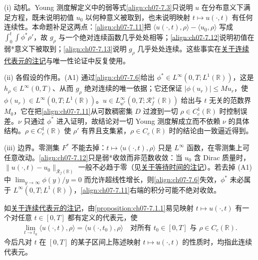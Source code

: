 ﻿\documentclass[../../main.tex]{subfiles}%
\begin{document}
\begin{remark}\label{remark:ch07-7.1.1动机}
(i) 动机。Young 测度解定义中的弱等式\eqref{align:ch07-7.3}只说明 $u$ 在分布意义下满足方程，既未说明初值 $u_0$ 以何种意义被取到，也未说明映射 $t\mapsto u(\cdot,t)$ 有任何连续性。本命题补足这两点：\eqref{align:ch07-7.11}把 $\langle u(\cdot,t),\rho\rangle-\langle u_0,\rho\rangle$ 写成 $\int_0^t\int\phi^*\rho'$，故 $g_\rho$ 与一个绝对连续函数几乎处处相等；\eqref{align:ch07-7.12}说明初值在弱*意义下被取到；\eqref{align:ch07-7.13}说明 $g_\rho$ 几乎处处连续。这些事实在\hyperref[remark:ch07-7.1.4]{关于连续代表元的注记}与唯一性论证中反复使用。

(ii) 各假设的作用。(A1) 通过\eqref{align:ch07-7.6}给出 $\phi^*\in L^\infty(0,T;L^1(\mathbb{R}))$，这是 $h_\rho\in L^\infty(0,T)$、从而 $g_\rho$ 绝对连续的唯一依据；它还保证 $|\phi(u_r)|\leqslant Mu_r$，使 $\phi(u_r)\in L^\infty(0,T;L^1(\mathbb{R}))$。$u\in L^\infty_{w^*}(0,T;\mathscr{R}_f^+(\mathbb{R}))$ 给出与 $t$ 无关的范数界 $M_0$，它在把\eqref{align:ch07-7.11}从可数稠密集 $D$ 过渡到一切 $\rho\in C_c^1(\mathbb{R})$ 时控制误差。$\nu$ 只通过 $\phi^*$ 进入证明，故结论对一切 Young 测度解成立而不依赖 $\nu$ 的具体结构。$\rho\in C_c^1(\mathbb{R})$ 使 $\rho'$ 有界且支集紧，$\rho\in C_c(\mathbb{R})$ 时的结论由一致逼近得到。

(iii) 边界。零测集 $F^*$ 不能去掉：$t\mapsto\langle u(\cdot,t),\rho\rangle$ 只是 $L^\infty$ 函数，在零测集上可任意改动。\eqref{align:ch07-7.12}只是弱*收敛而非范数收敛：当 $u_0$ 含 Dirac 质量时，$\|u(\cdot,t)-u_0\|_{\mathscr{R}_f(\mathbb{R})}$ 一般不必趋于零（见\hyperref[remark:ch07-7.2.1]{关于等待时间的注记}）。若去掉 (A1) 中 $\lim_{y\to\infty}\phi(y)/y=0$ 而允许超线性增长，则\eqref{align:ch07-7.6}失效，$\phi^*$ 未必属于 $L^\infty(0,T;L^1(\mathbb{R}))$，\eqref{align:ch07-7.11}右端的积分可能不绝对收敛。
\end{remark}

\begin{remark}\label{remark:ch07-7.1.4}
如\hyperref[remark:ch06-6.1.2]{关于连续代表元的注记}，由\cref{proposition:ch07-7.1.1}易见映射 $t\mapsto u(\cdot,t)$ 有一个对任意 $t\in[0,T]$ 都有定义的代表元，使
\begin{align}
\lim_{t\to t_0}\langle u(\cdot,t),\rho\rangle=\langle u(\cdot,t_0),\rho\rangle
\quad\text{对所有 }t_0\in[0,T]\text{ 与 }\rho\in C_c(\mathbb{R}). \label{align:ch07-7.14}
\end{align}
今后凡对 $t$ 在 $[0,T]$ 的某子区间上陈述映射 $t\mapsto u(\cdot,t)$ 的性质时，均指此连续代表元。
\end{remark}
\end{document}
